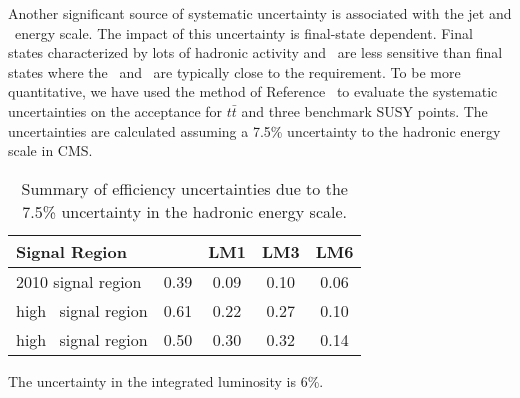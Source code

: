Another significant source of systematic uncertainty is 
associated with the jet and \met\ energy scale.  The impact
of this uncertainty is final-state dependent.  Final
states characterized by lots of hadronic activity and \met\ are 
less sensitive than final states where the \met\ and \Ht\
are typically close to the requirement.  To be more quantitative,
we have used the method of Reference~\cite{ref:top} to evaluate
the systematic uncertainties on the acceptance for $t\bar{t}$ 
and three benchmark SUSY points.  The uncertainties are calculated
assuming a 7.5\% uncertainty to the hadronic energy scale in CMS.

\begin{table}[hbt]
\begin{center}
\caption{\label{tab:jetmet} 
Summary of efficiency uncertainties due to the 7.5\% uncertainty in the hadronic energy scale.
}
\vspace{.25cm}
\begin{tabular}{l|cccc}
\hline
Signal Region             & \ttbar  &   LM1   &   LM3  &  LM6  \\
\hline
2010 signal region        &  0.39   &  0.09   &  0.10  &  0.06 \\
high \met\ signal region  &  0.61   &  0.22   &  0.27  &  0.10 \\ 
high \Ht\ signal region   &  0.50   &  0.30   &  0.32  &  0.14 \\
\hline
\end{tabular}
\end{center}
\end{table}

The uncertainty in the integrated luminosity is 6\%.
